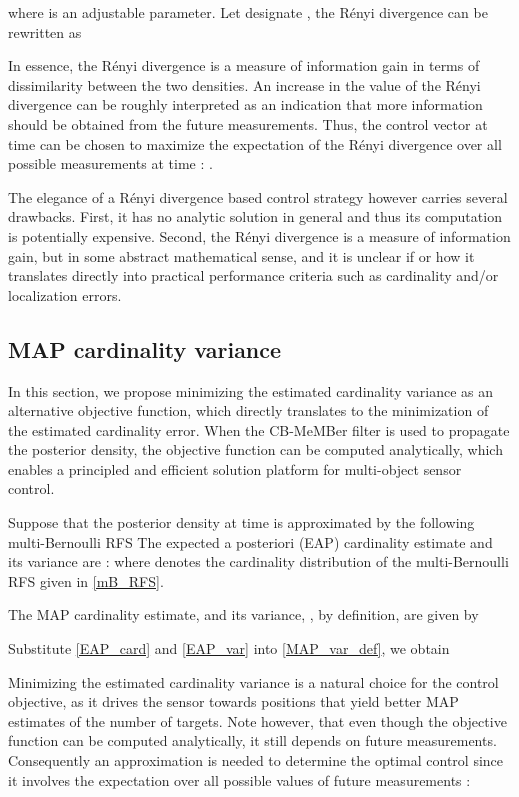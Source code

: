 \documentclass[twocolumn]{autart}
\begin{document}
where  is an adjustable parameter. Let  designate , the R\'{e}nyi divergence can be rewritten as \cite {RV10}


In essence, the R\'{e}nyi divergence is a measure of information gain in
terms of dissimilarity between the two densities. An increase in the value
of the R\'{e}nyi divergence can be roughly interpreted as an indication that
more information should be obtained from the future measurements. Thus, the
control vector  at time  can be chosen to maximize the
expectation of the R\'{e}nyi divergence over all possible measurements at
time : .

The elegance of a R\'{e}nyi divergence based control strategy however
carries several drawbacks. First, it has no analytic solution in general
and thus its computation is potentially expensive. Second, the R\'{e}nyi
divergence is a measure of information gain, but in some abstract
mathematical sense, and it is unclear if or how it translates directly into
practical performance criteria such as cardinality and/or localization
errors.

\subsection{MAP cardinality variance}

In this section, we propose minimizing the estimated cardinality
variance as an alternative objective function, which directly translates to the
minimization of the estimated cardinality error. When the CB-MeMBer filter
is used to propagate the posterior density, the objective function can be
computed analytically, which enables a principled and efficient solution
platform for multi-object sensor control.

Suppose that the posterior density at time  is approximated by the
following multi-Bernoulli RFS
The expected a posteriori (EAP) cardinality estimate and its variance are
\cite{Mah07}:
where  denotes the cardinality
distribution of the multi-Bernoulli RFS given in \eqref{mB_RFS}.

The MAP cardinality estimate,  and its variance,
, by definition, are given by

Substitute \eqref{EAP_card} and \eqref{EAP_var} into \eqref{MAP_var_def}, we obtain

Minimizing the estimated cardinality variance  is a natural choice for the control objective, as it drives the
sensor towards positions that yield better MAP estimates of the number of
targets. Note however, that even though the objective function  can be computed analytically, it
still depends on future measurements. Consequently an approximation is
needed to determine the optimal control since it involves the expectation  over
all possible values of future measurements :
\end{document}
